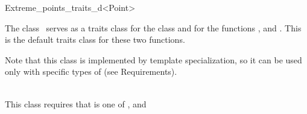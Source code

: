 \begin{ccRefClass}{Extreme_points_traits_d<Point>} 


\ccDefinition
  
The class \ccRefName\ serves as a traits class for the class  and for the functions ,  and . This is the default traits class for these two functions.

Note that this class is implemented by template specialization, so it can be used only with specific types of  (see Requirements).


\ccIsModel

 \\

This class requires that  is one of ,  and 




\ccSeeAlso

\\
\\
\\

\ccParDims

\cgalColumnLayout
\end{ccRefClass}


